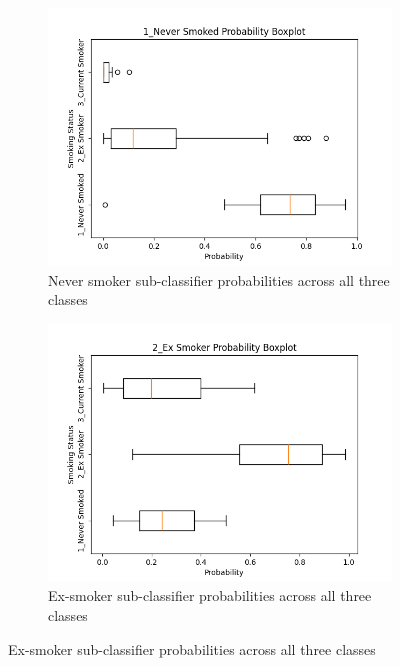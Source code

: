 \documentclass{article}
\begin{document}
\begin{figure}
    \centering
    \begin{subfigure}{0.48\textwidth}
        \centering
        \includegraphics[width=\linewidth]{cohort1_1_boxplot.png}
        \caption{Never smoker sub-classifier probabilities across all three classes}
    \end{subfigure}
    \hfill
    \begin{subfigure}{0.48\textwidth}
        \centering
        \includegraphics[width=\linewidth]{cohort1_2_boxplot.png}
        \caption{Ex-smoker sub-classifier probabilities across all three classes}
    \end{subfigure}
    \par\vspace{0.5em}

\end{figure}
\end{document}
